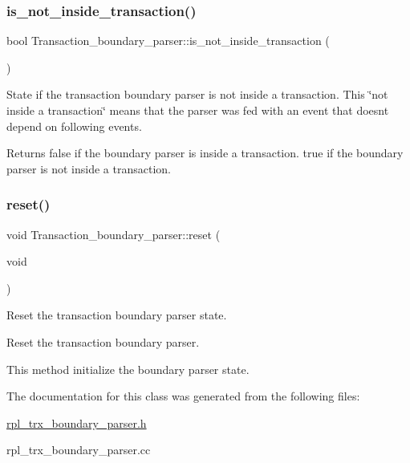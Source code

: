 \subsubsection{\texorpdfstring{is\+\_\+not\+\_\+inside\+\_\+transaction()}{is\_not\_inside\_transaction()}}
{\footnotesize\ttfamily bool Transaction\+\_\+boundary\+\_\+parser\+::is\+\_\+not\+\_\+inside\+\_\+transaction (\begin{DoxyParamCaption}{ }\end{DoxyParamCaption})\hspace{0.3cm}{\ttfamily [inline]}}

State if the transaction boundary parser is not inside a transaction. This \char`\"{}not inside a transaction\char`\"{} means that the parser was fed with an event that doesn\textquotesingle{}t depend on following events.

\begin{DoxyReturn}{Returns}
false if the boundary parser is inside a transaction. true if the boundary parser is not inside a transaction. 
\end{DoxyReturn}
\mbox{\label{classTransaction__boundary__parser_aeaef08e74aca6c66acaacd3d8c7d9faa}} 
\subsubsection{\texorpdfstring{reset()}{reset()}}
{\footnotesize\ttfamily void Transaction\+\_\+boundary\+\_\+parser\+::reset (\begin{DoxyParamCaption}\item[{void}]{ }\end{DoxyParamCaption})}

Reset the transaction boundary parser state.

Reset the transaction boundary parser.

This method initialize the boundary parser state. 

The documentation for this class was generated from the following files\+:\begin{DoxyCompactItemize}
\item 
\mbox{\hyperlink{rpl__trx__boundary__parser_8h}{rpl\+\_\+trx\+\_\+boundary\+\_\+parser.\+h}}\item 
rpl\+\_\+trx\+\_\+boundary\+\_\+parser.\+cc\end{DoxyCompactItemize}
